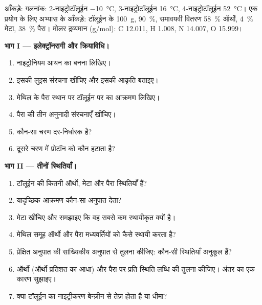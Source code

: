 \begin{problem}
\label{pb:b2:aromatic-substitution:1}
आँकड़े: गलनांक: 2-नाइट्रोटॉलूईन \qty{-10}{\degreeCelsius}, 3-नाइट्रोटॉलूईन
\qty{16}{\degreeCelsius}, 4-नाइट्रोटॉलूईन \qty{52}{\degreeCelsius}। एक प्रयोग के लिए अभ्यास के आँकड़े:
टॉलूईन के \qty{100}{g},  90~\%, समावयवी वितरण 58~\% ऑर्थो, 4~\% मेटा,
38~\% पैरा। मोलर द्रव्यमान (\unit{g/mol}): C 12.011, H 1.008, N 14.007, O 15.999।

\medskip
\noindent\textbf{भाग I --- इलेक्ट्रॉनरागी और क्रियाविधि।}
\begin{enumerate}
  \item नाइट्रोनियम आयन का बनना लिखिए।
  \item इसकी लुइस संरचना खींचिए और इसकी आकृति बताइए।
  \item मेथिल के पैरा स्थान पर टॉलूईन पर  का आक्रमण लिखिए।
  \item पैरा  की तीन अनुनादी संरचनाएँ खींचिए।
  \item कौन-सा चरण दर-निर्धारक है?
  \item दूसरे चरण में प्रोटॉन को कौन हटाता है?
\end{enumerate}

\medskip
\noindent\textbf{भाग II --- तीनों स्थितियाँ।}
\begin{enumerate}[resume]
  \item टॉलूईन की कितनी ऑर्थो, मेटा और पैरा स्थितियाँ हैं?
  \item यादृच्छिक आक्रमण कौन-सा अनुपात देता?
  \item मेटा  खींचिए और समझाइए कि वह सबसे कम स्थायीकृत क्यों है।
  \item मेथिल समूह ऑर्थो और पैरा मध्यवर्तियों को कैसे स्थायी करता है?
  \item प्रेक्षित अनुपात की सांख्यिकीय अनुपात से तुलना कीजिए: कौन-सी स्थितियाँ अनुकूल हैं?
  \item ऑर्थो (ऑर्थो प्रतिशत का आधा) और पैरा पर प्रति स्थिति लब्धि की तुलना कीजिए।
        अंतर का एक कारण सुझाइए।
  \item क्या टॉलूईन का नाइट्रीकरण बेन्ज़ीन से तेज़ होता है या धीमा?
\end{enumerate}


\end{problem}
